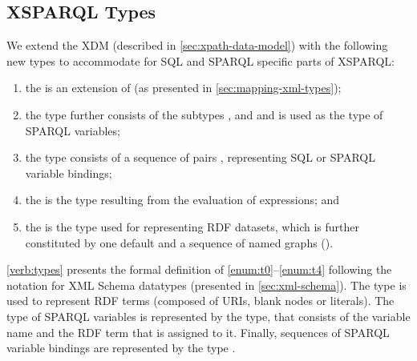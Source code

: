 \subsection{XSPARQL Types}
\label{sec:xsparql-types}
%
We extend the \acl{XDM} (described in \cref{sec:xpath-data-model}) with the following new types to accommodate
for \ac{SQL} and SPARQL specific parts of XSPARQL:
%
\begin{enumerate}[(1),noitemsep]
\item\label{enum:t0} the  is an extension of  (as presented in
  \cref{sec:mapping-xml-types});
\item\label{enum:t1} the  type further consists of the subtypes ,  and
   and is used as the type of SPARQL variables;
\item\label{enum:t2} the  type consists of a sequence of pairs , representing \ac{SQL} or SPARQL variable bindings;
\item\label{enum:t3} the  is the type resulting from the evaluation of \CONSTRUCT expressions; and
\item\label{enum:t4} the  is the type used for representing \ac{RDF} datasets, which is further
  constituted by one default  and a sequence of named graphs ().
\end{enumerate}
%
\cref{verb:types} presents the formal definition of \ref{enum:t0}--\ref{enum:t4} following the notation for \ac{XML}
Schema datatypes (presented in \cref{sec:xml-schema}).
%
The  type is used to represent RDF terms (composed of \acp{URI}, blank nodes or literals).  The type of
SPARQL variables is represented by the  type, that consists of the variable name and the RDF term that is
assigned to it.
%
Finally, sequences of SPARQL variable bindings are represented by the type .  

